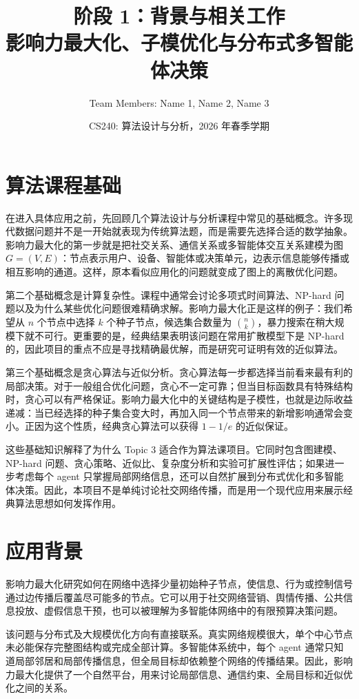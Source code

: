\documentclass[UTF8, 11pt]{ctexart}
\title{\textbf{阶段 1：背景与相关工作}\\
影响力最大化、子模优化与分布式多智能体决策}
\author{Team Members: Name 1, Name 2, Name 3}
\date{CS240: 算法设计与分析，2026 年春季学期}
\begin{document}
\maketitle

\section{算法课程基础}

在进入具体应用之前，先回顾几个算法设计与分析课程中常见的基础概念。许多现代数据问题并不是一开始就表现为传统算法题，而是需要先选择合适的数学抽象。影响力最大化的第一步就是把社交关系、通信关系或多智能体交互关系建模为图 $G=(V,E)$：节点表示用户、设备、智能体或决策单元，边表示信息能够传播或相互影响的通道。这样，原本看似应用化的问题就变成了图上的离散优化问题。

第二个基础概念是计算复杂性。课程中通常会讨论多项式时间算法、NP-hard 问题以及为什么某些优化问题很难精确求解。影响力最大化正是这样的例子：我们希望从 $n$ 个节点中选择 $k$ 个种子节点，候选集合数量为 $\binom{n}{k}$，暴力搜索在稍大规模下就不可行。更重要的是，经典结果表明该问题在常用扩散模型下是 NP-hard 的，因此项目的重点不应是寻找精确最优解，而是研究可证明有效的近似算法。

第三个基础概念是贪心算法与近似分析。贪心算法每一步都选择当前看来最有利的局部决策。对于一般组合优化问题，贪心不一定可靠；但当目标函数具有特殊结构时，贪心可以有严格保证。影响力最大化中的关键结构是子模性，也就是边际收益递减：当已经选择的种子集合变大时，再加入同一个节点带来的新增影响通常会变小。正因为这个性质，经典贪心算法可以获得 $1-1/e$ 的近似保证。

这些基础知识解释了为什么 Topic 3 适合作为算法课项目。它同时包含图建模、NP-hard 问题、贪心策略、近似比、复杂度分析和实验可扩展性评估；如果进一步考虑每个 agent 只掌握局部网络信息，还可以自然扩展到分布式优化和多智能体决策。因此，本项目不是单纯讨论社交网络传播，而是用一个现代应用来展示经典算法思想如何发挥作用。

\section{应用背景}

影响力最大化研究如何在网络中选择少量初始种子节点，使信息、行为或控制信号通过边传播后覆盖尽可能多的节点。它可以用于社交网络营销、舆情传播、公共信息投放、虚假信息干预，也可以被理解为多智能体网络中的有限预算决策问题。

该问题与分布式及大规模优化方向有直接联系。真实网络规模很大，单个中心节点未必能保存完整图结构或完成全部计算。多智能体系统中，每个 agent 通常只知道局部邻居和局部传播信息，但全局目标却依赖整个网络的传播结果。因此，影响力最大化提供了一个自然平台，用来讨论局部信息、通信约束、全局目标和近似优化之间的关系。
\end{document}
